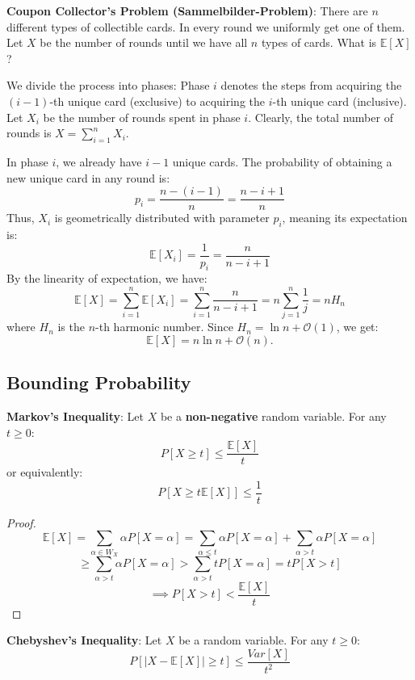 \begin{example}
    \textbf{Coupon Collector's Problem (Sammelbilder-Problem)}:
    There are $n$ different types of collectible cards. In every round we uniformly get one of them. Let $X$ be the number of rounds until we have all $n$ types of cards. What is $\mathbb{E}[X]$?
    
    We divide the process into phases: Phase $i$ denotes the steps from acquiring the $(i-1)$-th unique card (exclusive) to acquiring the $i$-th unique card (inclusive). Let $X_i$ be the number of rounds spent in phase $i$. Clearly, the total number of rounds is $X = \sum_{i=1}^n X_i$.
    
    In phase $i$, we already have $i-1$ unique cards. The probability of obtaining a new unique card in any round is:
    $$p_i = \frac{n - (i - 1)}{n} = \frac{n - i + 1}{n}$$
    Thus, $X_i$ is geometrically distributed with parameter $p_i$, meaning its expectation is:
    $$\mathbb{E}[X_i] = \frac{1}{p_i} = \frac{n}{n - i + 1}$$
    By the linearity of expectation, we have:
    $$\mathbb{E}[X] = \sum_{i=1}^n \mathbb{E}[X_i] = \sum_{i=1}^n \frac{n}{n - i + 1} = n \sum_{j=1}^n \frac{1}{j} = n H_n$$
    where $H_n$ is the $n$-th harmonic number. Since $H_n = \ln n + \mathcal{O}(1)$, we get:
    $$\mathbb{E}[X] = n \ln n + \mathcal{O}(n).$$
\end{example}

\subsection{Bounding Probability}

\begin{theorem}
    \textbf{Markov's Inequality}: Let $X$ be a \textbf{non-negative} random variable. For any $t \geq 0$:
    $$P[X \geq t] \leq \frac{\mathbb{E}[X]}{t}$$
    or equivalently:
    $$P[X \geq t \mathbb{E}[X]] \leq \frac{1}{t}$$
\end{theorem}

\begin{proof}
    $$\mathbb{E}[X] = \sum_{\alpha \in W_X} \alpha P[X=\alpha] = \sum_{\alpha \le t} \alpha P[X=\alpha] + \sum_{\alpha > t} \alpha P[X=\alpha]$$
    $$\geq \sum_{\alpha > t} \alpha P[X=\alpha] > \sum_{\alpha > t} t P[X=\alpha] = t P[X > t]$$
    $$\implies P[X > t] < \frac{\mathbb{E}[X]}{t}$$
\end{proof}

\begin{theorem}
    \textbf{Chebyshev's Inequality}: Let $X$ be a random variable. For any $t \geq 0$:
    $$P[|X-\mathbb{E}[X]| \geq t] \leq \frac{Var[X]}{t^2}$$
\end{theorem}

